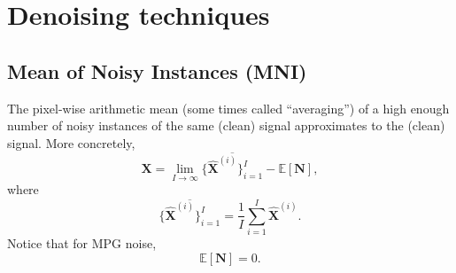 \documentclass{article}
\begin{document}


\section{Denoising techniques}


\subsection{Mean of Noisy Instances (MNI)}

The pixel-wise arithmetic mean (some times called ``averaging'') of a
high enough number of noisy instances of the same (clean) signal
approximates to the (clean) signal. More concretely,
\begin{equation}
  {\mathbf X} = \lim_{I \to \infty} \overline{\{\hat{\mathbf X}^{(i)}\}_{i=1}^I}  - \mathbb{E}\left[\mathbf{N}\right],
  \label{eq:mean_with_bias}
\end{equation}
where
\begin{equation}
  \overline{\{\hat{\mathbf X}^{(i)}\}_{i=1}^I} = \frac{1}{I} \sum_{i=1}^I \hat{\mathbf X}^{(i)}.
  \label{eq:mean}
\end{equation}
Notice that for MPG noise,
\begin{equation}
  \mathbb{E}\left[\mathbf{N}\right] = 0.
\end{equation}
\end{document}
